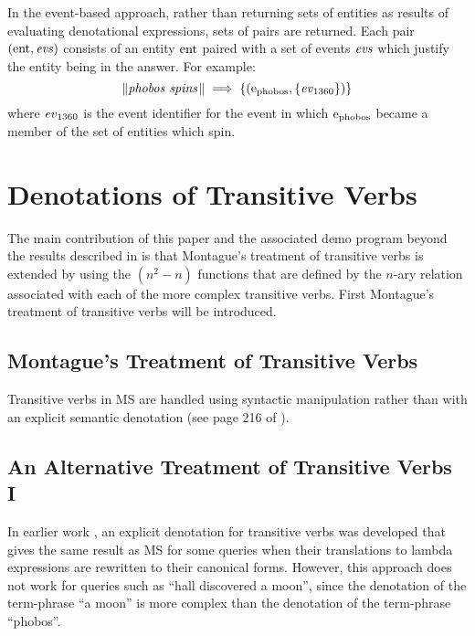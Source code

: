 \documentclass[../main.tex]{subfiles}
\begin{document}
\begin{refsection}
In the event-based approach, rather than returning sets of entities as results of evaluating denotational
expressions, sets of pairs are returned. Each pair $(\operatorname{ent}, \operatorname{\mathit{evs}})$ consists of an entity $\operatorname{ent}$ paired with a set of
events $\operatorname{\mathit{evs}}$ which justify the entity being in the answer. For example:
\[ \lVert\textit{phobos spins\hspace{0.1em}}\rVert \implies \{(\mathrm{e}_{\operatorname{\operatorname{phobos}}}, \{\operatorname{\mathit{ev}}_{1360}\})\} \]
where $\operatorname{\mathit{ev}}_{1360}$ is the event identifier for the event in which $\mathrm{e}_{\operatorname{\operatorname{phobos}}}$ became a member of the set of entities which spin.


\section{Denotations of Transitive Verbs}
\label{icsc2020conf:newuevflms}

The main contribution of this paper and the associated demo program beyond the results described in \cite{frost2014demonstration,hafiz:frost} is that Montague's treatment of transitive verbs is extended by using the
$(n^2 - n)$ functions that are defined by the $n$-ary relation associated with each of the more complex
transitive verbs. First Montague's treatment of transitive verbs will be introduced.

\subsection{Montague's Treatment of Transitive Verbs}


\label{icsc2020conf:montytransitive}
Transitive verbs in MS are handled using syntactic manipulation rather than with an explicit semantic denotation (see page 216 of \cite{Dowty:wall}).


\subsection{An Alternative Treatment of Transitive Verbs I}
In earlier work \cite {frost2006realization}, an explicit denotation for transitive verbs was developed that gives the same result as MS for some queries when their translations to lambda expressions are rewritten to their canonical forms. However, this approach does not work for queries such as ``hall discovered a moon'', since the denotation of the term-phrase ``a moon'' is more complex than the denotation of the term-phrase ``phobos''.


\end{refsection}
\end{document}
